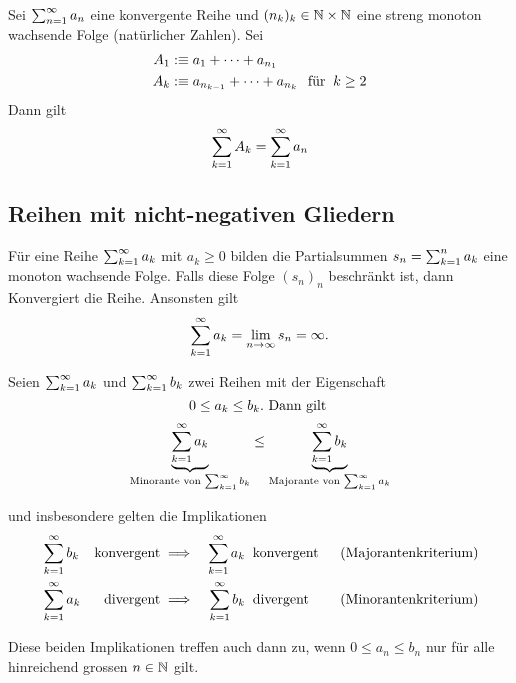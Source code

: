 \begin{thm}
	Sei $\sumninfty a_n$ eine konvergente Reihe und $(n_k)_k \in \nat \times \nat$ eine streng monoton wachsende Folge (natürlicher Zahlen).
	Sei 
	\begin{equation}
		\begin{aligned}
			A_1 &: \equiv a_1 + \cdots + a_{n_1} \\
			A_k &: \equiv a_{n_{k-1}} + \cdots + a_{n_k} \fuer k \geq 2
		\end{aligned}
	\end{equation}
	Dann gilt
	\begin{equation}
		\sumkinfty A_k = \sumkinfty a_n
	\end{equation}
\end{thm}

\subsection{Reihen mit nicht-negativen Gliedern}

\begin{thm}
	Für eine Reihe $\sumkinfty a_k$ mit $a_k \geq 0$ bilden die Partialsummen $s_n=\sumkn a_k$ eine monoton wachsende Folge. Falls diese Folge $(s_n)_n$ beschränkt ist, dann Konvergiert die Reihe. Ansonsten gilt
	\begin{equation}
		\sumkinfty a_k = \limninfty s_n = \infty.
	\end{equation}	
\end{thm}

\begin{thm}[Vergleichssatz]
	
	Seien $\sumkinfty a_k$ und $\sumkinfty b_k$ zwei Reihen mit der Eigenschaft 
	\begin{equation}
		0\leq a_k \leq b_k. $ Dann gilt $
	\end{equation}
	\begin{equation}
	 	\underbrace{\sumkinfty a_k}_{\text{Minorante von $\sumkinfty b_k$}}  \leq \underbrace{\sumkinfty b_k}_{\text{Majorante von $\sumkinfty a_k$}} 
	\end{equation} 
	
	und insbesondere gelten die Implikationen
	\begin{equation}
		\begin{aligned}
			&\sumkinfty b_k
			&\text{konvergent} 
			&\implies 
			&\sumkinfty a_k 
			&\mytext{konvergent} 
			&\text{(Majorantenkriterium)} \\
			&\sumkinfty a_k
			&\text{divergent} 
			&\implies 
			&\sumkinfty b_k 
			&\mytext{divergent} 
			&\text{(Minorantenkriterium)}
		\end{aligned}
	\end{equation}
	
	Diese beiden Implikationen treffen auch dann zu, wenn $0\leq a_n \leq b_n$ nur für alle hinreichend grossen $n \in \nat$ gilt.
\end{thm}

